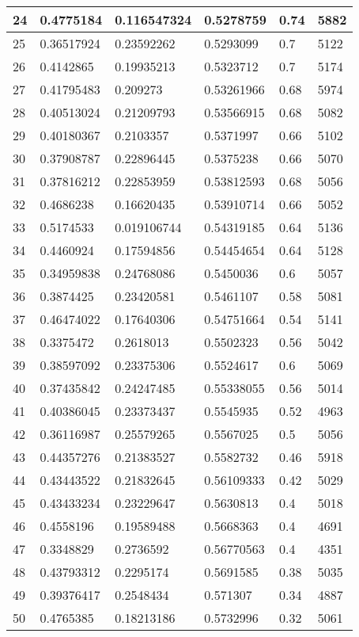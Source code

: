 \begin{longtable}{|l|l|l|l|l|l|}
24 & 0.4775184 & 0.116547324 & 0.5278759 & 0.74 & 5882 \\ \hline 
25 & 0.36517924 & 0.23592262 & 0.5293099 & 0.7 & 5122 \\ \hline 
26 & 0.4142865 & 0.19935213 & 0.5323712 & 0.7 & 5174 \\ \hline 
27 & 0.41795483 & 0.209273 & 0.53261966 & 0.68 & 5974 \\ \hline 
28 & 0.40513024 & 0.21209793 & 0.53566915 & 0.68 & 5082 \\ \hline 
29 & 0.40180367 & 0.2103357 & 0.5371997 & 0.66 & 5102 \\ \hline 
30 & 0.37908787 & 0.22896445 & 0.5375238 & 0.66 & 5070 \\ \hline 
31 & 0.37816212 & 0.22853959 & 0.53812593 & 0.68 & 5056 \\ \hline 
32 & 0.4686238 & 0.16620435 & 0.53910714 & 0.66 & 5052 \\ \hline 
33 & 0.5174533 & 0.019106744 & 0.54319185 & 0.64 & 5136 \\ \hline 
34 & 0.4460924 & 0.17594856 & 0.54454654 & 0.64 & 5128 \\ \hline 
35 & 0.34959838 & 0.24768086 & 0.5450036 & 0.6 & 5057 \\ \hline 
36 & 0.3874425 & 0.23420581 & 0.5461107 & 0.58 & 5081 \\ \hline 
37 & 0.46474022 & 0.17640306 & 0.54751664 & 0.54 & 5141 \\ \hline 
38 & 0.3375472 & 0.2618013 & 0.5502323 & 0.56 & 5042 \\ \hline 
39 & 0.38597092 & 0.23375306 & 0.5524617 & 0.6 & 5069 \\ \hline 
40 & 0.37435842 & 0.24247485 & 0.55338055 & 0.56 & 5014 \\ \hline 
41 & 0.40386045 & 0.23373437 & 0.5545935 & 0.52 & 4963 \\ \hline 
42 & 0.36116987 & 0.25579265 & 0.5567025 & 0.5 & 5056 \\ \hline 
43 & 0.44357276 & 0.21383527 & 0.5582732 & 0.46 & 5918 \\ \hline 
44 & 0.43443522 & 0.21832645 & 0.56109333 & 0.42 & 5029 \\ \hline 
45 & 0.43433234 & 0.23229647 & 0.5630813 & 0.4 & 5018 \\ \hline 
46 & 0.4558196 & 0.19589488 & 0.5668363 & 0.4 & 4691 \\ \hline 
47 & 0.3348829 & 0.2736592 & 0.56770563 & 0.4 & 4351 \\ \hline 
48 & 0.43793312 & 0.2295174 & 0.5691585 & 0.38 & 5035 \\ \hline 
49 & 0.39376417 & 0.2548434 & 0.571307 & 0.34 & 4887 \\ \hline 
50 & 0.4765385 & 0.18213186 & 0.5732996 & 0.32 & 5061 \\ \hline 
\end{longtable}